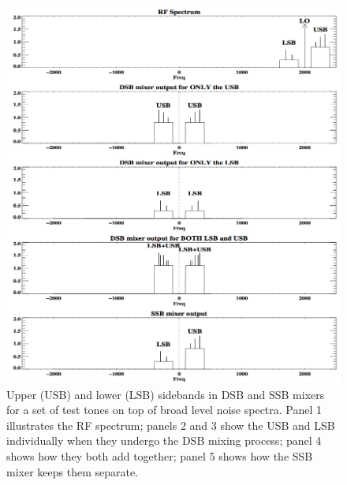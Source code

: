 \documentclass[11pt,preprint]{aastex}
\begin{document}
\begin{figure}[p!]
  \includegraphics[width=6.5in]{sideband.png}
\caption{Upper (USB) and lower (LSB) sidebands in DSB and SSB mixers for a set of
test tones on top of broad level noise spectra. Panel 1 illustrates
  the RF
spectrum; panels 2 and 3 show the USB and LSB individually when
they undergo the DSB mixing process; panel 4 shows how they both add
together; panel 5 shows how the SSB mixer keeps them
separate. \label{sideband}}
\end{figure}
%
%
%
\end{document}
